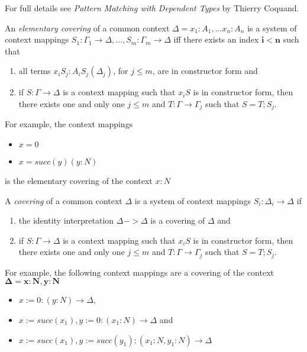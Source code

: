 For full details see \textit{Pattern Matching with Dependent Types} by Thierry Coquand.

An \textit{elementary covering} of a common context $\Delta = x_1 : A_1,...x_n : A_n$ is a system of context mappings $S_1 : \Gamma_1 \to \Delta, ..., S_m : \Gamma_m \to \Delta$ iff there exists an index $\boldsymbol{i < n}$ such that

\begin{enumerate}
  \item all terms $x_iS_j : A_iS_j(\Delta_j)$, for $j \leq m$, are in constructor form and
  \item if $S : \Gamma \to \Delta$ is a context mapping such that $x_iS$ is in constructor form, then there exists one and only one $j \leq m$ and $T : \Gamma \to \Gamma_j$ such that $S=T;S_j$.
  
\end{enumerate}

For example, the context mappings

\begin{itemize}
  \item $x = 0$
  \item $x = succ(y) (y : N)$
\end{itemize}

is the elementary covering of the context $x : N$

A \textit{covering} of a common context $\Delta$ is a system of context mappings $S_i : \Delta_i \to \Delta$ if

\begin{enumerate}
  \item the identity interpretation $\Delta -> \Delta$ is a covering of $\Delta$ and
  \item if $S : \Gamma \to \Delta$ is a context mapping such that $x_iS$ is in constructor form, then there exists one and only one $j \leq m$ and $T : \Gamma \to \Gamma_j$ such that $S = T;S_j$. 
\end{enumerate}

For example, the following context mappings are a covering of the context $\boldsymbol{\Delta = x : N, y : N}$

\begin{itemize}
  \item ${x := 0} : (y : N) \to \Delta$,
  \item ${x := succ(x_1), y:= 0} : (x_1 : N) \to \Delta$ and
  \item ${x := succ(x_1), y:= succ(y_1)} : (x_1 : N, y_1 : N) \to \Delta$
\end{itemize}

